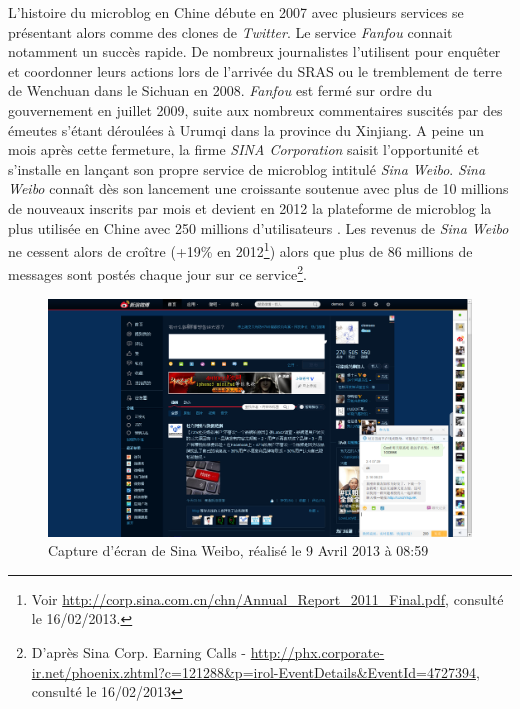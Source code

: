 L’histoire du microblog en Chine débute en 2007 avec plusieurs services se présentant alors comme des clones de \textit{Twitter}. Le service \textit{Fanfou} connait notamment un succès rapide. De nombreux journalistes l’utilisent pour enquêter et coordonner leurs actions lors de l’arrivée du SRAS ou le tremblement de terre de Wenchuan dans le Sichuan en 2008. \textit{Fanfou} est fermé sur ordre du gouvernement en juillet 2009, suite aux nombreux commentaires suscités par des émeutes s’étant déroulées à Urumqi dans la province du Xinjiang. A peine un mois après cette fermeture, la firme \textit{SINA Corporation} saisit l’opportunité et s’installe en lançant son propre service de microblog intitulé \textit{Sina Weibo}. \textit{Sina Weibo} connaît dès son lancement une croissante soutenue avec plus de 10 millions de nouveaux inscrits par mois et devient en 2012 la plateforme de microblog la plus utilisée en Chine avec 250 millions d’utilisateurs \citep{McKinsey2012}. Les revenus de \textit{Sina Weibo} ne cessent alors de croître (+19\% en 2012\footnote{Voir \url{http://corp.sina.com.cn/chn/Annual_Report_2011_Final.pdf}, consulté le 16/02/2013.}) alors que plus de 86 millions de messages sont postés chaque jour sur ce service\footnote{D’après Sina Corp. Earning Calls - \url{http://phx.corporate-ir.net/phoenix.zhtml?c=121288&p=irol-EventDetails&EventId=4727394}, consulté le 16/02/2013}. 


\begin{figure}[htbp]
    \centering
    \includegraphics[scale=0.3]{figures/chap1/screenshot.png}
    \caption[Capture d’écran de Sina Weibo]{Capture d’écran de Sina Weibo, réalisé le 9 Avril 2013 à 08:59}
    \label{fig:screenshot_weibo}
\end{figure}

